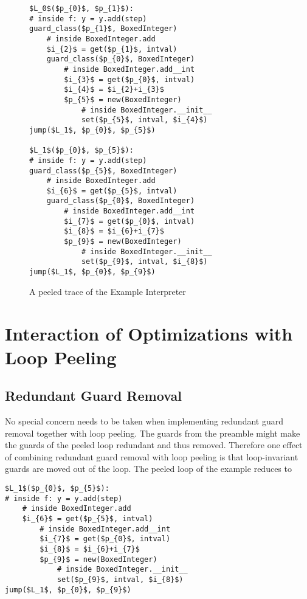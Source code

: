 \documentclass[preprint]{sigplanconf}
\begin{document}
\begin{figure}
\begin{lstlisting}[mathescape,numbers = right,basicstyle=\setstretch{1.05}\ttfamily\scriptsize]
$L_0$($p_{0}$, $p_{1}$):
# inside f: y = y.add(step)
guard_class($p_{1}$, BoxedInteger)
    # inside BoxedInteger.add
    $i_{2}$ = get($p_{1}$, intval)
    guard_class($p_{0}$, BoxedInteger)
        # inside BoxedInteger.add__int
        $i_{3}$ = get($p_{0}$, intval)
        $i_{4}$ = $i_{2}+i_{3}$
        $p_{5}$ = new(BoxedInteger)
            # inside BoxedInteger.__init__
            set($p_{5}$, intval, $i_{4}$)
jump($L_1$, $p_{0}$, $p_{5}$)

$L_1$($p_{0}$, $p_{5}$):
# inside f: y = y.add(step)
guard_class($p_{5}$, BoxedInteger)
    # inside BoxedInteger.add
    $i_{6}$ = get($p_{5}$, intval)
    guard_class($p_{0}$, BoxedInteger)
        # inside BoxedInteger.add__int
        $i_{7}$ = get($p_{0}$, intval)
        $i_{8}$ = $i_{6}+i_{7}$
        $p_{9}$ = new(BoxedInteger)
            # inside BoxedInteger.__init__
            set($p_{9}$, intval, $i_{8}$)
jump($L_1$, $p_{0}$, $p_{9}$)
\end{lstlisting}
\caption{A peeled trace of the Example Interpreter}
\label{fig:peeled-trace}
\end{figure}

\section{Interaction of Optimizations with Loop Peeling}

\subsection{Redundant Guard Removal}

No special concern needs to be taken when implementing redundant
guard removal together with loop peeling. The guards from
the preamble might make the guards of the peeled loop
redundant and thus removed. Therefore one effect of combining redundant
guard removal with loop peeling is that loop-invariant guards are moved out of the
loop. The peeled loop of the example reduces to

\begin{lstlisting}[mathescape,numbers = right,basicstyle=\setstretch{1.05}\ttfamily\scriptsize]
$L_1$($p_{0}$, $p_{5}$):
# inside f: y = y.add(step)
    # inside BoxedInteger.add
    $i_{6}$ = get($p_{5}$, intval)
        # inside BoxedInteger.add__int
        $i_{7}$ = get($p_{0}$, intval)
        $i_{8}$ = $i_{6}+i_{7}$
        $p_{9}$ = new(BoxedInteger)
            # inside BoxedInteger.__init__
            set($p_{9}$, intval, $i_{8}$)
jump($L_1$, $p_{0}$, $p_{9}$)
\end{lstlisting}
\end{document}
